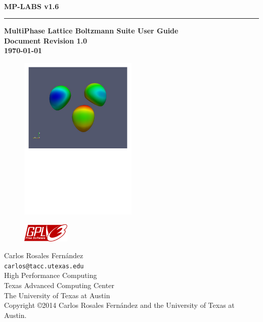 \documentclass[12pt]{report}
\begin{document}
\thispagestyle{empty}	%
\verb+ +
\vspace{1em}
\begin{flushright}
\huge\bf MP-LABS v1.6\\
\rule{\textwidth}{4pt}
\large{\bf MultiPhase Lattice Boltzmann Suite User Guide\\
Document Revision 1.0\\
\today}
\end{flushright}

\vspace{1cm}
\begin{figure}[!hbt]
\centering
\includegraphics[width=0.5\textwidth]{bubble_3.pdf}
\end{figure}

\newpage
\thispagestyle{empty}
\begin{flushleft}
\begin{figure}
\includegraphics[width=0.2\textwidth]{gplv3-127x51.png}
\end{figure}
Carlos Rosales Fern\'andez\\
\verb+carlos@tacc.utexas.edu+\\
\vspace{0.5em}
High Performance Computing \\
Texas Advanced Computing Center\\
The University of Texas at Austin\\
\vspace{1cm}
Copyright \copyright 2014 Carlos Rosales Fern\'andez and the University of Texas at Austin.
\end{flushleft}
\newpage
\end{document}
